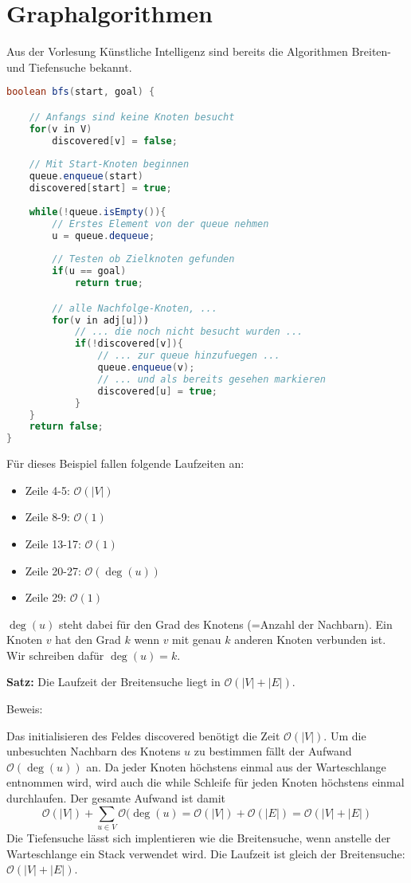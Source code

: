 \chapter{Graphalgorithmen}
Aus der Vorlesung Künstliche Intelligenz sind bereits die Algorithmen Breiten- und Tiefensuche bekannt.
\begin{lstlisting}[language=java, caption={Beispiel Algorithmus für die Breitensuche}]
boolean bfs(start, goal) {

	// Anfangs sind keine Knoten besucht
	for(v in V)
		discovered[v] = false;
	
	// Mit Start-Knoten beginnen
	queue.enqueue(start)
	discovered[start] = true;
	
	while(!queue.isEmpty()){
		// Erstes Element von der queue nehmen
		u = queue.dequeue;
		
		// Testen ob Zielknoten gefunden
		if(u == goal)
			return true;

		// alle Nachfolge-Knoten, ...
		for(v in adj[u]))
			// ... die noch nicht besucht wurden ...
			if(!discovered[v]){
				// ... zur queue hinzufuegen ...
				queue.enqueue(v);
				// ... und als bereits gesehen markieren
				discovered[u] = true;
			}
	}
	return false;
}
\end{lstlisting}

Für dieses Beispiel fallen folgende Laufzeiten an:
\begin{itemize}
	\item Zeile 4-5: \(\mathcal{O}(|V|)\)
	\item Zeile 8-9: \(\mathcal{O}(1)\)
	\item Zeile 13-17: \(\mathcal{O}(1)\)
	\item Zeile 20-27: \(\mathcal{O}(\deg(u))\)
	\item Zeile 29: \(\mathcal{O}(1)\)
\end{itemize}
\(\deg(u)\) steht dabei für den Grad des Knotens (=Anzahl der Nachbarn).
Ein Knoten \(v\) hat den Grad \(k\) wenn \(v\) mit genau \(k\) anderen Knoten verbunden ist.
Wir schreiben dafür \(\deg(u) = k\).

\begin{shaded}
  \noindent
  \textbf{Satz:} Die Laufzeit der Breitensuche liegt in \(\mathcal{O}(|V|+|E|)\).
\end{shaded}
Beweis:

Das initialisieren des Feldes discovered benötigt die Zeit \(\mathcal{O}(|V|)\).
Um die unbesuchten Nachbarn des Knotens \(u\) zu bestimmen fällt der Aufwand \(\mathcal{O}(\deg(u))\) an.
Da jeder Knoten höchstens einmal aus der Warteschlange entnommen wird, wird auch die while Schleife für jeden Knoten höchstens einmal durchlaufen.
Der gesamte Aufwand ist damit
\[\mathcal{O}(|V|) + \sum\limits_{u \in V} \mathcal{O}(\deg(u) = \mathcal{O}(|V|) + \mathcal{O}(|E|) = \mathcal{O}(|V| + |E|)\]
Die Tiefensuche lässt sich implentieren wie die Breitensuche, wenn anstelle der Warteschlange ein Stack verwendet wird.
Die Laufzeit ist gleich der Breitensuche: \(\mathcal{O}(|V| + |E|)\).


